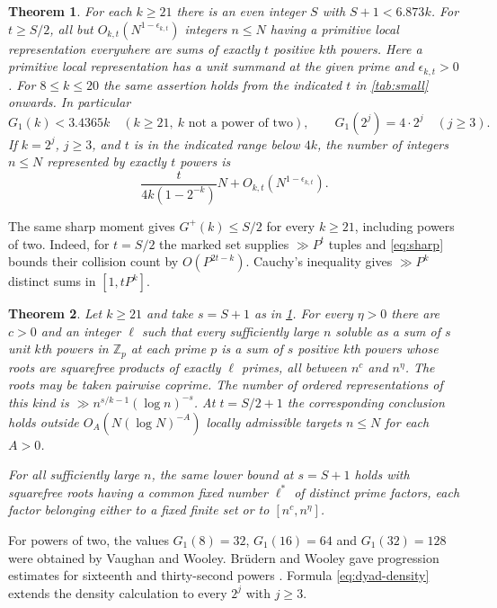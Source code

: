 \documentclass[11pt,letterpaper]{article}
\newtheorem{theorem}{Theorem}[section]
\theoremstyle{definition}
\newcommand{\Z}{\mathbb Z}
\begin{document}
\begin{theorem}\label{thm:density}
For each $k\ge21$ there is an even integer $S$ with $S+1<6.873k$.
For $t\ge S/2$, all but $O_{k,t}(N^{1-\epsilon_{k,t}})$ integers
$n\le N$ having a primitive local representation everywhere are sums of
exactly $t$ positive $k$th powers. Here a primitive local representation
has a unit summand at the given prime and $\epsilon_{k,t}>0$.
For $8\le k\le20$ the same assertion holds from the indicated $t$ in
\cref{tab:small} onwards. In particular
\[
 G_1(k)<3.4365k\quad(k\ge21,\ k\text{ not a power of two}),
 \qquad G_1(2^j)=4\cdot2^j\quad(j\ge3).
\]
If $k=2^j$, $j\ge3$, and $t$ is in the indicated range below $4k$,
the number of integers $n\le N$ represented by exactly $t$ powers is
\begin{equation}\label{eq:dyad-density}
 \frac{t}{4k(1-2^{-k})}N+O_{k,t}(N^{1-\epsilon_{k,t}}).
\end{equation}
\end{theorem}
The same sharp moment gives $G^+(k)\le S/2$ for every $k\ge21$,
including powers of two. Indeed, for $t=S/2$ the marked set supplies
$\gg P^t$ tuples and \eqref{eq:sharp} bounds their collision count by
$O(P^{2t-k})$. Cauchy's inequality gives $\gg P^k$ distinct sums in
$[1,tP^k]$.
\begin{theorem}\label{thm:primes}
Let $k\ge21$ and take $s=S+1$ as in \cref{thm:density}. For every
$\eta>0$ there are $c>0$ and an integer $\ell$ such that every sufficiently
large $n$ soluble as a sum of $s$ unit $k$th powers in $\Z_p$ at each
prime $p$ is a sum of $s$ positive $k$th powers whose roots are squarefree
products of exactly $\ell$ primes, all between $n^c$ and $n^\eta$.
The roots may be taken pairwise coprime.
The number of ordered representations of this kind is
$\gg n^{s/k-1}(\log n)^{-s}$. At $t=S/2+1$ the corresponding conclusion
holds outside $O_A(N(\log N)^{-A})$ locally admissible targets $n\le N$
for each $A>0$.

For all sufficiently large $n$, the same lower bound at $s=S+1$
holds with squarefree roots having a common fixed number $\ell^*$ of
distinct prime factors, each factor belonging either to a fixed finite
set or to $[n^c,n^\eta]$.
\end{theorem}
For powers of two, the values $G_1(8)=32$, $G_1(16)=64$ and
$G_1(32)=128$ were obtained by Vaughan and Wooley. Br\"udern and
Wooley gave progression estimates for sixteenth and thirty-second powers
\cite[Theorems 9.1 and 9.2]{BW23}. Formula \eqref{eq:dyad-density}
extends the density calculation to every $2^j$ with $j\ge3$.
\end{document}
